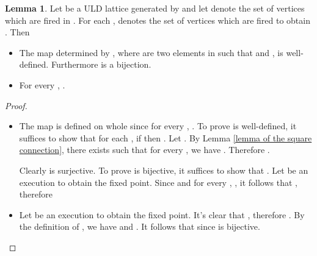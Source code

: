 \documentclass{article}
\theoremstyle{definition}
\newtheorem{lem}{Lemma}
\begin{document}
\begin{lem}
\label{lemma of relation}
Let  be a ULD lattice generated by  and let  denote the set of vertices which are fired in . For each ,  denotes the set of vertices which are fired to obtain .   Then
\begin{itemize}
  \item[1. ]  The map  determined by , where  are two elements in  such that  and , is well-defined. Furthermore  is a bijection.
  \item[2. ] For every , .
\end{itemize}  
\end{lem}
\begin{proof}\\
\begin{itemize}
\item[1. ] The map  is defined on whole  since for every , . To prove  is well-defined, it suffices to show that for each , if  then .  Let . By Lemma \ref{lemma of the square connection}, there exists  such that for every , we have . Therefore .

\hspace{3.ex} Clearly  is surjective. To prove  is bijective, it suffices to show that . Let  be an execution to obtain the fixed point. Since  and for every , , it follows that , therefore 
\item[2. ] Let  be an execution to obtain the fixed point. It's clear that , therefore  \linebreak . By the definition of , we have  and . It follows that  since  is bijective. 
\end{itemize}
\end{proof}
\end{document}
